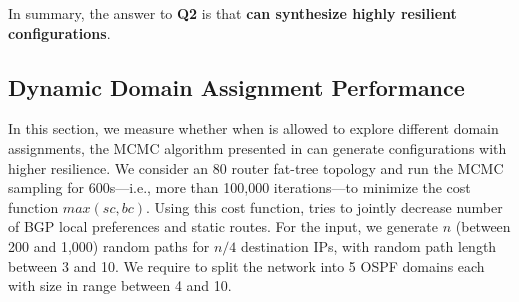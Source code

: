 \begin{figure}
	\centering
\end{figure}
In summary, the answer to \textbf{Q2} is that
\textbf{\name can synthesize highly resilient configurations}.


\subsection{Dynamic Domain Assignment Performance} \label{sec:mcmceval}

In this section, we measure whether
when \name  is allowed to explore different domain assignments,
the MCMC algorithm presented in 
can 
generate configurations
with higher resilience. 
We consider an 80 router fat-tree topology and run the MCMC sampling
for 600s---i.e., more than 100,000 iterations---to minimize the
 cost function $max(sc, bc)$. Using this cost function, \name
 tries to jointly decrease number of 
 BGP local preferences and static routes. 
 For the input, we generate $n$ (between
200 and 1,000) random paths for $n/4$ destination IPs, with random
path length between 3 and 10.  We require \name to split the network
into 5 OSPF domains each with size in range between 4 and 10.

